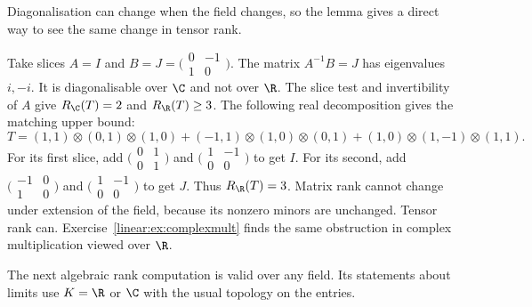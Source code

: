 Diagonalisation can change when the field changes, so the lemma gives a direct way to see the same change in tensor rank.

\begin{example}\label{linear:exa:rotation}
Take slices $A=I$ and $B=J=\bigl(\begin{smallmatrix}0&-1\\1&0\end{smallmatrix}\bigr)$. The matrix $A^{-1}B=J$ has eigenvalues $i,-i$. It is diagonalisable over $\C$ and not over $\R$. The slice test and invertibility of $A$ give $R_\C(T)=2$ and $R_\R(T)\ge3$. The following real decomposition gives the matching upper bound:
\[
T=(1,1)\otimes(0,1)\otimes(1,0)
 +(-1,1)\otimes(1,0)\otimes(0,1)
 +(1,0)\otimes(1,-1)\otimes(1,1).
\]
For its first slice, add $\bigl(\begin{smallmatrix}0&1\\0&1\end{smallmatrix}\bigr)$ and $\bigl(\begin{smallmatrix}1&-1\\0&0\end{smallmatrix}\bigr)$ to get $I$. For its second, add $\bigl(\begin{smallmatrix}-1&0\\1&0\end{smallmatrix}\bigr)$ and $\bigl(\begin{smallmatrix}1&-1\\0&0\end{smallmatrix}\bigr)$ to get $J$. Thus $R_\R(T)=3$. Matrix rank cannot change under extension of the field, because its nonzero minors are unchanged. Tensor rank can. Exercise~\ref{linear:ex:complexmult} finds the same obstruction in complex multiplication viewed over $\R$.
\end{example}

The next algebraic rank computation is valid over any field. Its statements about limits use $K=\R$ or $\C$ with the usual topology on the entries.


